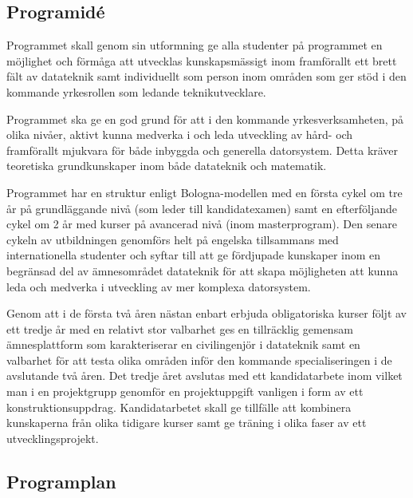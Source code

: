 \documentclass[twocolumn]{article}
\begin{document}
\subsection{Programidé}

Programmet skall genom sin utformning ge alla studenter på programmet
en möjlighet och förmåga att utvecklas kunskapsmässigt inom
framförallt ett brett fält av datateknik samt individuellt som person
inom områden som ger stöd i den kommande yrkesrollen som ledande
teknikutvecklare.

Programmet ska ge en god grund för att i den kommande
yrkesverksamheten, på olika nivåer, aktivt kunna medverka i och leda
utveckling av hård- och framförallt mjukvara för både inbyggda och
generella datorsystem. Detta kräver teoretiska grundkunskaper inom
både datateknik och matematik.

Programmet har en struktur enligt Bologna-modellen med en första cykel
om tre år på grundläggande nivå (som leder till kandidat\-examen) samt
en efterföljande cykel om 2 år med kurser på avancerad nivå (inom
masterprogram). Den senare cykeln av utbildningen genomförs helt på
engelska tillsammans med internationella studenter och syftar till att
ge fördjupade kunskaper inom en begränsad del av ämnesområdet
datateknik för att skapa möjligheten att kunna leda och medverka i
utveckling av mer komplexa datorsystem.

Genom att i de första två åren nästan enbart erbjuda obligatoriska
kurser följt av ett tredje år med en relativt stor valbarhet ges en
tillräcklig gemensam ämnesplattform som karakteriserar en
civilingenjör i datateknik samt en valbarhet för att testa olika
områden inför den kommande specialiseringen i de avslutande två åren.
Det tredje året avslutas med ett kandidatarbete inom vilket man i en
projektgrupp genomför en projektuppgift vanligen i form av ett
konstruktionsuppdrag. Kandidatarbetet skall ge tillfälle att kombinera
kunskaperna från olika tidigare kurser samt ge träning i olika faser
av ett utvecklingsprojekt.

\subsection{Programplan}
\end{document}
